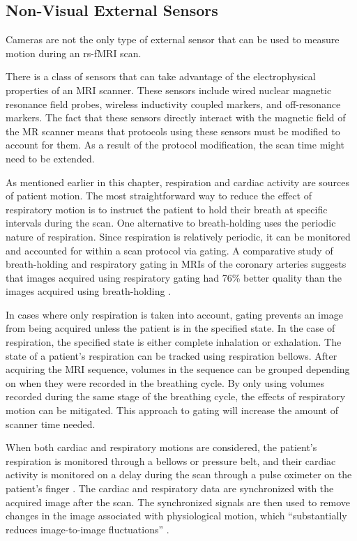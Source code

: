 \subsection{Non-Visual External Sensors}

Cameras are not the only type of external sensor that can be used to measure motion during an rs-fMRI scan. 

There is a class of sensors that can take advantage of the electrophysical properties of an MRI scanner. These sensors include wired nuclear magnetic resonance field probes, wireless inductivity coupled markers, and off-resonance markers. %
The fact that these sensors directly interact with the magnetic field of the MR scanner means that protocols using these sensors must be modified to account for them. As a result of the protocol modification, the scan time might need to be extended.

As mentioned earlier in this chapter, respiration and cardiac activity are sources of patient motion. The most straightforward way to reduce the effect of respiratory motion is to instruct the patient to hold their breath at specific intervals during the scan. One alternative to breath-holding uses the periodic nature of respiration. Since respiration is relatively periodic, it can be monitored and accounted for within a scan protocol via gating. A comparative study of breath-holding and respiratory gating in MRIs of the coronary arteries suggests that images acquired using respiratory gating had 76\% better quality than the images acquired using breath-holding \cite{PMID:7822549}.

In cases where only respiration is taken into account, gating prevents an image from being acquired unless the patient is in the specified state. In the case of respiration, the specified state is either complete inhalation or exhalation. The state of a patient's respiration can be tracked using respiration bellows. After acquiring the MRI sequence, volumes in the sequence can be grouped depending on when they were recorded in the breathing cycle. By only using volumes recorded during the same stage of the breathing cycle, the effects of respiratory motion can be mitigated. This approach to gating will increase the amount of scanner time needed.

When both cardiac and respiratory motions are considered, the patient's respiration is monitored through a bellows or pressure belt, and their cardiac activity is monitored on a delay during the scan through a pulse oximeter on the patient's finger \cite{Hu1995}. The cardiac and respiratory data are synchronized with the acquired image after the scan. The synchronized signals are then used to remove changes in the image associated with physiological motion, which ``substantially reduces image-to-image fluctuations'' \cite{Hu199}.

